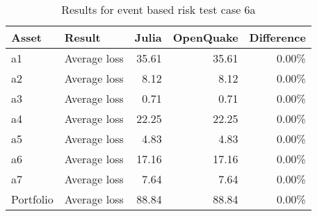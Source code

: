 \begin{table}[htbp]

\centering
\begin{tabular}{ l l r r r }

\hline
\rowcolor{anti-flashwhite}
\bf{Asset} & \bf{Result} & \bf{Julia} & \bf{OpenQuake} & \bf{Difference}\\
\hline
a1 & Average loss & 35.61 & 35.61 & 0.00\% \\
a2 & Average loss & 8.12 & 8.12 & 0.00\% \\
a3 & Average loss & 0.71 & 0.71 & 0.00\% \\
a4 & Average loss & 22.25 & 22.25 & 0.00\% \\
a5 & Average loss & 4.83 & 4.83 & 0.00\% \\
a6 & Average loss & 17.16 & 17.16 & 0.00\% \\
a7 & Average loss & 7.64 & 7.64 & 0.00\% \\
\hline
Portfolio & Average loss & 88.84 & 88.84 & 0.00\% \\
\hline
\end{tabular}

\caption{Results for event based risk test case 6a}
\label{tab:result-ebr-6a}
\end{table}